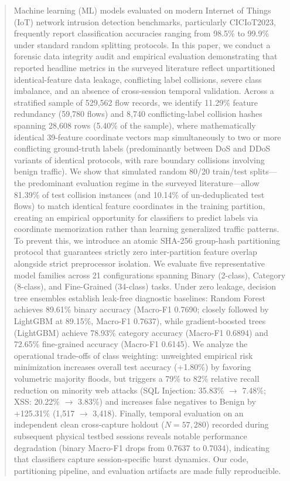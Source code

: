\documentclass[conference,10pt,twocolumn]{IEEEtran}
\begin{document}
\begin{abstract}
Machine learning (ML) models evaluated on modern Internet of Things (IoT) network intrusion detection benchmarks, particularly CICIoT2023, frequently report classification accuracies ranging from 98.5\% to 99.9\% under standard random splitting protocols. In this paper, we conduct a forensic data integrity audit and empirical evaluation demonstrating that reported headline metrics in the surveyed literature reflect unpartitioned identical-feature data leakage, conflicting label collisions, severe class imbalance, and an absence of cross-session temporal validation. Across a stratified sample of 529,562 flow records, we identify 11.29\% feature redundancy (59,780 flows) and 8,740 conflicting-label collision hashes spanning 28,608 rows (5.40\% of the sample), where mathematically identical 39-feature coordinate vectors map simultaneously to two or more conflicting ground-truth labels (predominantly between DoS and DDoS variants of identical protocols, with rare boundary collisions involving benign traffic). We show that simulated random 80/20 train/test splits---the predominant evaluation regime in the surveyed literature---allow 81.39\% of test collision instances (and 10.14\% of un-deduplicated test flows) to match identical feature coordinates in the training partition, creating an empirical opportunity for classifiers to predict labels via coordinate memorization rather than learning generalized traffic patterns. To prevent this, we introduce an atomic SHA-256 group-hash partitioning protocol that guarantees strictly zero inter-partition feature overlap alongside strict preprocessor isolation. We evaluate five representative model families across 21 configurations spanning Binary (2-class), Category (8-class), and Fine-Grained (34-class) tasks. Under zero leakage, decision tree ensembles establish leak-free diagnostic baselines: Random Forest achieves 89.61\% binary accuracy (Macro-F1 0.7690; closely followed by LightGBM at 89.15\%, Macro-F1 0.7637), while gradient-boosted trees (LightGBM) achieve 78.93\% category accuracy (Macro-F1 0.6894) and 72.65\% fine-grained accuracy (Macro-F1 0.6145). We analyze the operational trade-offs of class weighting: unweighted empirical risk minimization increases overall test accuracy (+1.80\%) by favoring volumetric majority floods, but triggers a 79\% to 82\% relative recall reduction on minority web attacks (SQL Injection: 35.83\% $\to$ 7.48\%; XSS: 20.22\% $\to$ 3.83\%) and increases false negatives to Benign by +125.31\% (1,517 $\to$ 3,418). Finally, temporal evaluation on an independent clean cross-capture holdout ($N=57,280$) recorded during subsequent physical testbed sessions reveals notable performance degradation (binary Macro-F1 drops from 0.7637 to 0.7034), indicating that classifiers capture session-specific burst dynamics. Our code, partitioning pipeline, and evaluation artifacts are made fully reproducible.
\end{abstract}
\end{document}
